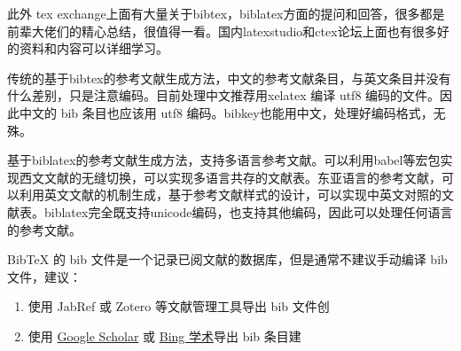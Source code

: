 此外 tex exchange上面有大量关于bibtex，biblatex方面的提问和回答，很多都是前辈大佬们的精心总结，很值得一看。国内latexstudio和ctex论坛上面也有很多好的资料和内容可以详细学习。



传统的基于bibtex的参考文献生成方法，中文的参考文献条目，与英文条目并没有什么差别，只是注意编码。目前处理中文推荐用xelatex 编译 utf8 编码的文件。因此中文的 bib 条目也应该用 utf8 编码。bibkey也能用中文，处理好编码格式，无殊。

基于biblatex的参考文献生成方法，支持多语言参考文献。可以利用babel等宏包实现西文文献的无缝切换，可以实现多语言共存的文献表。东亚语言的参考文献，可以利用英文文献的机制生成，基于参考文献样式的设计，可以实现中英文对照的文献表。biblatex完全既支持unicode编码，也支持其他编码，因此可以处理任何语言的参考文献。



BibTeX 的 bib 文件是一个记录已阅文献的数据库，但是通常不建议手动编译 bib
文件，建议：

\begin{enumerate}
\def\labelenumi{\arabic{enumi}.}

\item
  使用 JabRef 或 Zotero 等文献管理工具导出 bib 文件创
\item
  使用 \href{https://scholar.google.com/}{Google Scholar} 或
  \href{https://cn.bing.com/academic}{Bing 学术}导出 bib 条目建
\end{enumerate}

